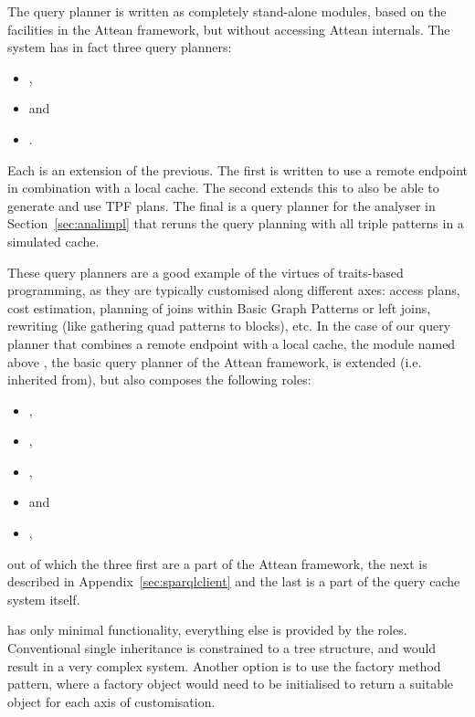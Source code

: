 The query planner is written as completely stand-alone modules, based
on the facilities in the Attean framework, but without accessing
Attean internals. The system has in fact three query planners:
\begin{itemize}
\item {},
\item {} and
\item {}.
\end{itemize}
Each is an
extension of the previous. The first is written to use a remote
endpoint in combination with a local cache. The second extends this to
also be able to generate and use TPF plans. The
final is a query planner for the analyser in Section~\ref{sec:analimpl}
that reruns the query planning with all triple patterns in a simulated
cache.

These query planners are a good example of the virtues of traits-based
programming, as they are typically customised along different axes:
access plans, cost estimation, planning of joins within Basic Graph
Patterns or left joins, rewriting (like gathering quad patterns to
blocks), etc. In the case of our query planner that combines a remote
endpoint with a local cache, the module named above
, the basic query planner of the
Attean framework,  is extended
(i.e. inherited from), but also composes the following roles:
\begin{itemize}
\item 
{},
\item {},
\item {},
\item {} and
\item {},
\end{itemize}
out of which the three
first are a part of the Attean framework, the next is described in
Appendix~\ref{sec:sparqlclient} and the last is a part of the
query cache system itself.


 has only minimal functionality,
everything else is provided by the roles. Conventional single
inheritance is constrained to a tree structure, and would result in a
very complex system. Another option is to use the factory method
pattern, where a factory object would need to be initialised to return
a suitable object for each axis of customisation. 

